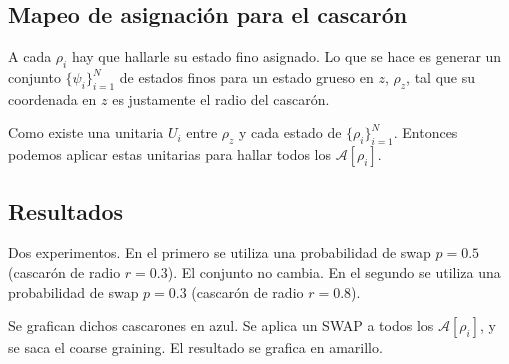 \documentclass[onecolumn,11pt]{article}
\newcommand{\mcA}{\mathcal{A}}
\begin{document}
\subsection{Mapeo de asignación para el cascarón}


A cada $\rho_{i}$ hay que hallarle su estado fino asignado. Lo que se hace es generar un conjunto $\{\psi_{i}\}_{i=1}^{N}$ de estados finos para un estado grueso en $z$, $\rho_{z}$, tal que su coordenada en $z$ es justamente el radio del cascarón.

Como existe una unitaria $U_{i}$ entre $\rho_{z}$ y cada estado de $\{\rho_{i}\}_{i=1}^{N}$. Entonces podemos aplicar estas unitarias para hallar todos los $\mcA[\rho_{i}]$.

\subsection{Resultados}

Dos experimentos. En el primero se utiliza una probabilidad de swap $p=0.5$ (cascarón de radio $r=0.3$). El conjunto no cambia. En el segundo se utiliza una probabilidad de swap $p=0.3$ (cascarón de radio $r=0.8$).

Se grafican dichos cascarones en azul. Se aplica un SWAP a todos los $\mcA[\rho_{i}]$, y se saca el coarse graining. El resultado se grafica en amarillo.
\end{document}
